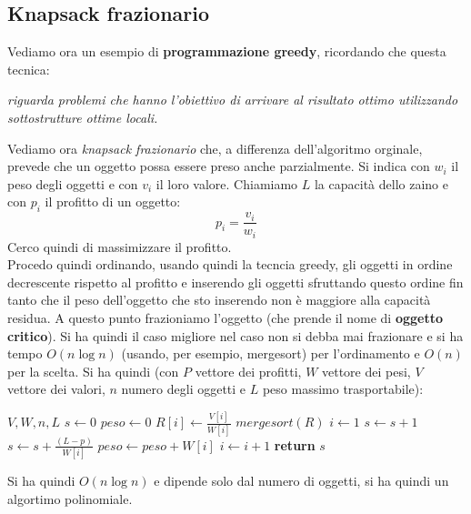 \documentclass[a4paper,12pt, oneside]{book}
\begin{document}
\subsection{Knapsack frazionario}
Vediamo ora un esempio di \textbf{programmazione greedy}, ricordando
che questa tecnica:
\begin{shaded}
  \textit{riguarda problemi che hanno l’obiettivo di arrivare al
    risultato ottimo utilizzando sottostrutture ottime locali.}
\end{shaded}
Vediamo ora \textit{knapsack frazionario} che, a differenza
dell'algoritmo orginale, prevede che un oggetto possa essere preso
anche parzialmente. Si indica con $w_i$ il peso degli oggetti e con
$v_i$ il loro valore. Chiamiamo $L$ la capacità dello zaino e con
$p_i$ il profitto di un oggetto:
\[p_i=\frac{v_i}{w_i}\]
Cerco quindi di massimizzare il profitto.\\
Procedo quindi ordinando, usando quindi la tecncia greedy, gli oggetti
in ordine decrescente rispetto al profitto e inserendo gli oggetti
sfruttando questo ordine fin tanto che il peso dell'oggetto che sto
inserendo non è maggiore alla capacità residua. A questo punto
frazioniamo l'oggetto (che prende il nome di \textbf{oggetto
  critico}). Si ha quindi il caso migliore nel caso non si debba mai
frazionare e si ha tempo $O(n\log n)$ (usando, per esempio, mergesort)
per l'ordinamento e $O(n)$ per la scelta. Si ha quindi (con $P$
vettore dei profitti, $W$ vettore dei pesi, $V$ vettore dei valori,
$n$ numero degli oggetti e $L$ peso massimo trasportabile):
\begin{shaded}
  \begin{algorithmic}
     {$V,W,n,L$}
    \State $s\gets 0$
    \State $peso\gets 0$
    \State
    \state $R[i]\gets \frac{V[i]}{W[i]}$
    \EndFor
    \State $mergesort(R)$
    \State $i\gets 1$
    \State $s\gets s+1$
    \Else
    \State $s\gets s+\frac{(L-p)}{W[i]}$
    \EndIf
    \State $peso\gets peso+W[i]$
    \State $i\gets i+1$
    \EndWhile
    \State \textbf{return} $s$
    \EndFunction
  \end{algorithmic}
\end{shaded}
Si ha quindi $O(n\log n)$ e dipende solo dal numero di oggetti, si ha
quindi un algortimo polinomiale.
\end{document}
